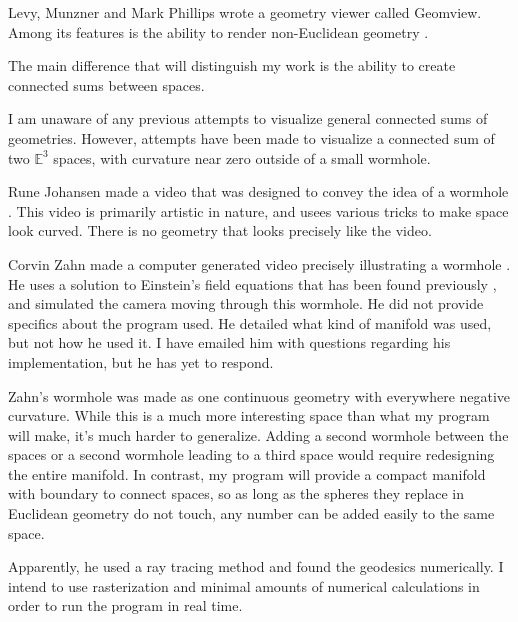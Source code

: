 \documentclass[12pt]{amsart}
\begin{document}
Levy, Munzner and Mark Phillips wrote a geometry viewer called Geomview. Among its features is the ability to render non-Euclidean geometry \cite{Geomview}.

The main difference that will distinguish my work is the ability to create connected sums between spaces.



I am unaware of any previous attempts to visualize general connected sums of geometries. However, attempts have been made to visualize a connected sum of two $\mathbb{E}^3$ spaces, with curvature near zero outside of a small wormhole.

Rune Johansen made a video that was designed to convey the idea of a wormhole \cite{runevision}. This video is primarily artistic in nature, and usees various tricks to make space look curved. There is no geometry that looks precisely like the video.

Corvin Zahn made a computer generated video precisely illustrating a wormhole \cite{spacetimetravel}. He uses a solution to Einstein's field equations that has been found previously \cite{WormholeSolution}, and simulated the camera moving through this wormhole. He did not provide specifics about the program used. He detailed what kind of manifold was used, but not how he used it. I have emailed him with questions regarding his implementation, but he has yet to respond.

Zahn's wormhole was made as one continuous geometry with everywhere negative curvature. While this is a much more interesting space than what my program will make, it's much harder to generalize. Adding a second wormhole between the spaces or a second wormhole leading to a third space would require redesigning the entire manifold. In contrast, my program will provide a compact manifold with boundary to connect spaces, so as long as the spheres they replace in Euclidean geometry do not touch, any number can be added easily to the same space.

Apparently, he used a ray tracing method and found the geodesics numerically. I intend to use rasterization and minimal amounts of numerical calculations in order to run the program in real time.







\end{document}
